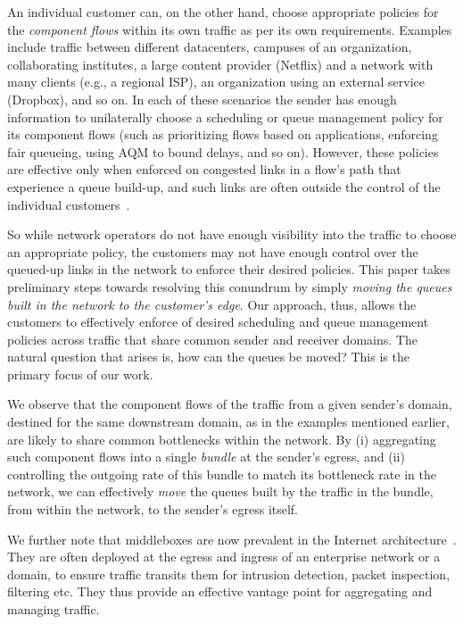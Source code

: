 An individual customer can, on the other hand, choose appropriate policies for the \emph{component flows} within its own traffic as per its own requirements. 
Examples include traffic between different datacenters, campuses of an organization, collaborating institutes, a large content provider (\eg Netflix) and a network with many clients (e.g., a regional ISP), an organization using an external service (\eg Dropbox), and so on. 
In each of these scenarios the sender has enough information to unilaterally choose a scheduling or queue management policy for its component flows (such as prioritizing flows based on applications, enforcing fair queueing, using AQM to bound delays, and so on). However, these policies are effective only when enforced on congested links in a flow's path that experience a queue build-up, and such links are often outside the control of the individual customers~\cite{inferring-interdomain-congestion}. 

So while network operators do not have enough visibility into the traffic to choose an appropriate policy, the customers may not have enough control over the queued-up links in the network to enforce their desired policies. This paper takes preliminary steps towards resolving this conundrum by simply \emph{moving the queues built in the network to the customer's edge}. Our approach, thus, allows the customers to effectively enforce of desired scheduling and queue management policies across traffic that share common sender and receiver domains. The natural question that arises is, how can the queues be moved? This is the primary focus of our work. 

We observe that the component flows of the traffic from a given sender's domain, destined for the same downstream domain, as in the examples mentioned earlier, are likely to share common bottlenecks within the network. By (i) aggregating such component flows into a single \emph{bundle} at the sender's egress, and (ii) controlling the outgoing rate of this bundle to match its bottleneck rate in the network, we can effectively \emph{move} the queues built by the traffic in the bundle, from within the network, to the sender's egress itself. 

We further note that middleboxes are now prevalent in the Internet architecture~\cite{aplomb}. They are often deployed at the egress and ingress of an enterprise network or a domain, to ensure traffic transits them for intrusion detection, packet inspection, filtering etc. They thus provide an effective vantage point for aggregating and managing traffic. 

